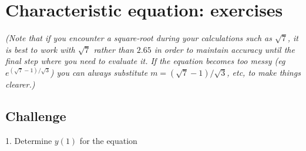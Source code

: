 %
%
%
%
%
%
%
%
%




\newpage
\section{Characteristic equation: exercises}

\emph{(Note that if you encounter a square-root during your calculations such as $\sqrt{7}$, it is best to work with $\sqrt{7}$ rather than $2.65$ in order to maintain accuracy until the final step where you need to evaluate it. If the equation becomes too messy (eg $e^{(\sqrt{7}-1)/\sqrt{3}}$) you can always substitute $m=(\sqrt{7}-1)/\sqrt{3}$, etc, to make things clearer.)}

\subsection*{Challenge}
1. Determine $y(1)$ for the equation

